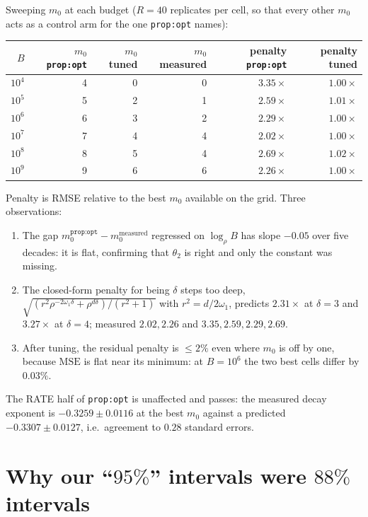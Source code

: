 \documentclass[11pt]{article}
\newcommand{\MSE}{\mathrm{MSE}}
\begin{document}
Sweeping $m_0$ at each budget ($R=40$ replicates per cell, so that every other
$m_0$ acts as a control arm for the one \texttt{prop:opt} names):

\begin{center}
\begin{tabular}{rrrrrr}
\toprule
$B$ & $m_0$ \texttt{prop:opt} & $m_0$ tuned & $m_0$ measured & penalty \texttt{prop:opt} & penalty tuned\\
\midrule
$10^4$ & 4 & 0 & 0 & $3.35\times$ & $1.00\times$\\
$10^5$ & 5 & 2 & 1 & $2.59\times$ & $1.01\times$\\
$10^6$ & 6 & 3 & 2 & $2.29\times$ & $1.00\times$\\
$10^7$ & 7 & 4 & 4 & $2.02\times$ & $1.00\times$\\
$10^8$ & 8 & 5 & 4 & $2.69\times$ & $1.02\times$\\
$10^9$ & 9 & 6 & 6 & $2.26\times$ & $1.00\times$\\
\bottomrule
\end{tabular}
\end{center}

\noindent
Penalty is RMSE relative to the best $m_0$ available on the grid. Three
observations:
\begin{enumerate}
  \item The gap $m_0^{\texttt{prop:opt}}-m_0^{\text{measured}}$ regressed on
    $\log_\rho B$ has slope $-0.05$ over five decades: it is flat, confirming
    that $\theta_2$ is right and only the constant was missing.
  \item The closed-form penalty for being $\delta$ steps too deep,
    $\sqrt{(r^2\rho^{-2\omega_1\delta}+\rho^{d\delta})/(r^2+1)}$ with
    $r^2=d/2\omega_1$, predicts $2.31\times$ at $\delta=3$ and $3.27\times$ at
    $\delta=4$; measured $2.02,2.26$ and $3.35,2.59,2.29,2.69$.
  \item After tuning, the residual penalty is $\le 2\%$ even where $m_0$ is off
    by one, because $\MSE$ is flat near its minimum: at $B=10^6$ the two best
    cells differ by $0.03\%$.
\end{enumerate}

The RATE half of \texttt{prop:opt} is unaffected and passes: the measured decay
exponent is $-0.3259\pm0.0116$ at the best $m_0$ against a predicted
$-0.3307\pm0.0127$, i.e.\ agreement to $0.28$ standard errors.

\part{Why our ``\texorpdfstring{$95\%$}{95\%}'' intervals were
\texorpdfstring{$88\%$}{88\%} intervals}
\label{part:cov}
\end{document}
